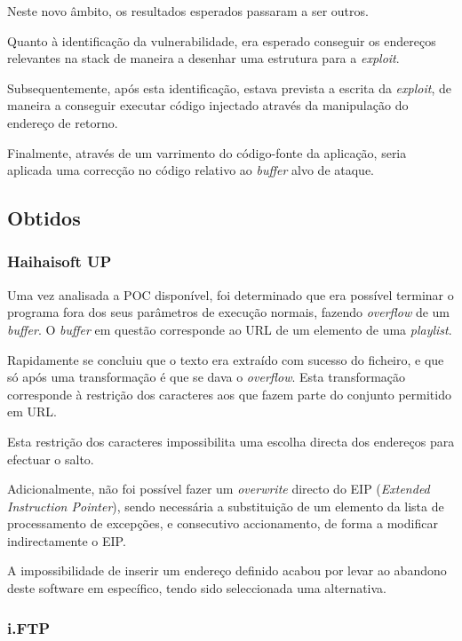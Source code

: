 \documentclass[11pt,a4paper]{article}
\begin{document}
Neste novo âmbito, os resultados esperados passaram a ser outros.

Quanto à identificação da vulnerabilidade, era esperado conseguir os endereços relevantes na stack de maneira a desenhar uma estrutura para a \textit{exploit}.

Subsequentemente, após esta identificação, estava prevista a escrita da \textit{exploit}, de maneira a conseguir executar código injectado através da manipulação do endereço de retorno.

Finalmente, através de um varrimento do código-fonte da aplicação, seria aplicada uma correcção no código relativo ao \textit{buffer} alvo de ataque.

\subsection{Obtidos}

\subsubsection{Haihaisoft UP}

Uma vez analisada a POC disponível, foi determinado que era possível terminar o programa fora dos seus parâmetros de execução normais, fazendo \textit{overflow} de um \textit{buffer}. O \textit{buffer} em questão corresponde ao URL de um elemento de uma \textit{playlist}.

Rapidamente se concluiu que o texto era extraído com sucesso do ficheiro, e que só após uma transformação é que se dava o \textit{overflow}. Esta transformação corresponde à restrição dos caracteres aos que fazem parte do conjunto permitido em URL.

Esta restrição dos caracteres impossibilita uma escolha directa dos endereços para efectuar o salto.

Adicionalmente, não foi possível fazer um \textit{overwrite} directo do EIP (\textit{Extended Instruction Pointer}), sendo necessária a substituição de um elemento da lista de processamento de excepções, e consecutivo accionamento, de forma a modificar indirectamente o EIP.

A impossibilidade de inserir um endereço definido acabou por levar ao abandono deste software em específico, tendo sido seleccionada uma alternativa.

\subsubsection{i.FTP}
\end{document}
